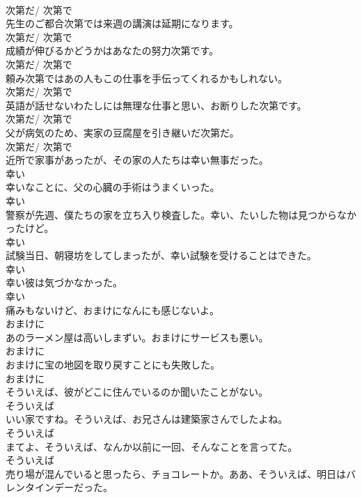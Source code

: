 \documentclass[8pt]{extreport}
\begin{document}
\begin{CJK}{UTF8}{min}
\\	次第だ/ 次第で	
\\	先生のご都合次第では来週の講演は延期になります。	
\\	次第だ/ 次第で	
\\	成績が伸びるかどうかはあなたの努力次第です。	
\\	次第だ/ 次第で	
\\	頼み次第ではあの人もこの仕事を手伝ってくれるかもしれない。	
\\	次第だ/ 次第で	
\\	英語が話せないわたしには無理な仕事と思い、お断りした次第です。	
\\	次第だ/ 次第で	
\\	父が病気のため、実家の豆腐屋を引き継いだ次第だ。	
\\	次第だ/ 次第で	
\\	近所で家事があったが、その家の人たちは幸い無事だった。	
\\	幸い	
\\	幸いなことに、父の心臓の手術はうまくいった。	
\\	幸い	
\\	警察が先週、僕たちの家を立ち入り検査した。幸い、たいした物は見つからなかったけど。	
\\	幸い	
\\	試験当日、朝寝坊をしてしまったが、幸い試験を受けることはできた。	
\\	幸い	
\\	幸い彼は気づかなかった。	
\\	幸い	
\\	痛みもないけど、おまけになんにも感じないよ。	
\\	おまけに	
\\	あのラーメン屋は高いしまずい。おまけにサービスも悪い。	
\\	おまけに	
\\	おまけに宝の地図を取り戻すことにも失敗した。	
\\	おまけに	
\\	そういえば、彼がどこに住んでいるのか聞いたことがない。	
\\	そういえば	
\\	いい家ですね。そういえば、お兄さんは建築家さんでしたよね。	
\\	そういえば	
\\	まてよ、そういえば、なんか以前に一回、そんなことを言ってた。	
\\	そういえば	
\\	売り場が混んでいると思ったら、チョコレートか。ああ、そういえば、明日はバレンタインデーだった。	

\end{CJK}
\end{document}
